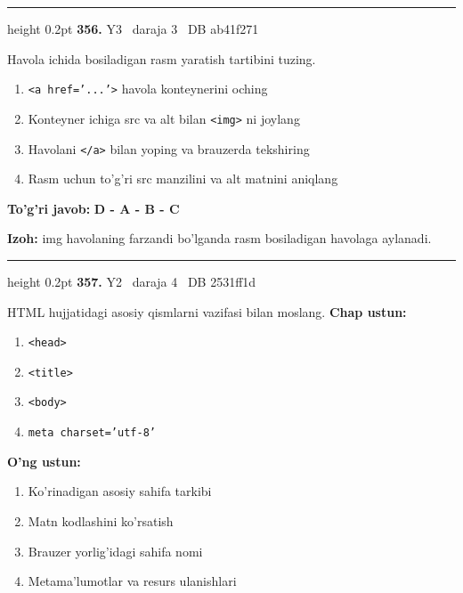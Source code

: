 \documentclass[10pt,a4paper,oneside]{article}
\begin{document}
\vspace{2mm}\hrule height 0.2pt \vspace{4mm}
\hypertarget{q356}{\textbf{\color{ink}356.}}  {\color{muted}\scriptsize Y3 \textbullet\ daraja 3 \textbullet\ DB ab41f271}
\par
Havola ichida bosiladigan rasm yaratish tartibini tuzing.
\begin{enumerate}[label=\Alph*),leftmargin=9mm]
\item \texttt{\textless{}a href='...'\textgreater{}} havola konteynerini oching
\item Konteyner ichiga src va alt bilan \texttt{\textless{}img\textgreater{}} ni joylang
\item Havolani \texttt{\textless{}/a\textgreater{}} bilan yoping va brauzerda tekshiring
\item Rasm uchun to'g'ri src manzilini va alt matnini aniqlang
\end{enumerate}
\begin{tcolorbox}[enhanced,breakable,colback=teal!4,colframe=teal!45!black,boxrule=0.45pt,arc=1.2mm,left=2.8mm,right=2.8mm,top=2mm,bottom=2mm,before skip=2mm,after skip=2mm]
\textbf{\color{teal}To'g'ri javob:} \textbf{D - A - B - C}
\par\smallskip
\textbf{Izoh:} img havolaning farzandi bo'lganda rasm bosiladigan havolaga aylanadi.
\end{tcolorbox}
\vspace{2mm}\hrule height 0.2pt \vspace{4mm}
\hypertarget{q357}{\textbf{\color{ink}357.}}  {\color{muted}\scriptsize Y2 \textbullet\ daraja 4 \textbullet\ DB 2531ff1d}
\par
HTML hujjatidagi asosiy qismlarni vazifasi bilan moslang.
\textbf{\footnotesize Chap ustun:}
\begin{enumerate}[label=\arabic*),leftmargin=9mm]
\item \texttt{\textless{}head\textgreater{}}
\item \texttt{\textless{}title\textgreater{}}
\item \texttt{\textless{}body\textgreater{}}
\item \texttt{meta charset='utf-8'}
\end{enumerate}
\textbf{\footnotesize O'ng ustun:}
\begin{enumerate}[label=\Alph*),leftmargin=9mm]
\item Ko'rinadigan asosiy sahifa tarkibi
\item Matn kodlashini ko'rsatish
\item Brauzer yorlig'idagi sahifa nomi
\item Metama'lumotlar va resurs ulanishlari
\end{enumerate}
\end{document}
